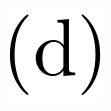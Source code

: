 \documentclass[
  a4paper,
]{scrbook}
\begin{document}
\begin{figure}
\begin{minipage}[t]{0.03\linewidth}
{{\includegraphics{figures/(d).png}

}

}

\end{minipage}%
%
\begin{minipage}[t]{0.01\linewidth}

{\centering 

~

}

\end{minipage}%
%
\begin{minipage}[t]{0.45\linewidth}

{\centering 


}

\end{minipage}%
%
\begin{minipage}[t]{0.01\linewidth}

{\centering 

}
\end{minipage}
\end{figure}
\end{document}
